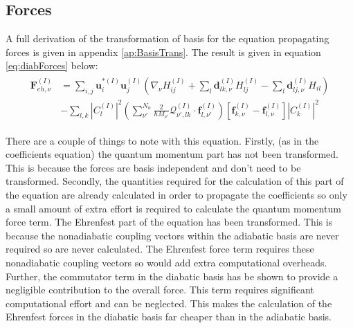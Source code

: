 \subsection{Forces}
A full derivation of the transformation of basis for the equation propagating forces is given in appendix \ref{ap:BasisTrans}. The result is given in equation \eqref{eq:diabForces} below:
\begin{align}
  \begin{split}
	  \mathbf{F}_{eh, \nu}^{(I)} &= \sum_{i,j} \mathbf{u}_{i}^{*(I)} \mathbf{u}_{j}^{(I)} \left( \nabla_{\nu} H_{ij}^{(I)} + \sum_{l} \mathbf{d}_{lk, \nu}^{(I)} H_{lj}^{(I)} - \sum_{l} \mathbf{d}_{lj, \nu}^{(I)} H_{il} \right) \\
	  &- \sum_{l,k} |C_{l}^{(I)}|^2 \left( \sum_{\nu'}^{N_{n}} \frac{2}{\hbar M_{\nu'}} \mathcal{Q}_{\nu', lk}^{(I)} \cdot                   \mathbf{f}_{l, \nu'}^{(I)} \right)\left[ \mathbf{f}_{k, \nu}^{(I)} -          \mathbf{f}_{l, \nu}^{(I)} \right] |C_{k}^{(I)}|^2
	\end{split}
  \label{eq:diabForces}
\end{align}

\noindent There are a couple of things to note with this equation. Firstly, (as in the coefficients equation) the quantum momentum part has not been transformed. This is because the forces are basis independent and don't need to be transformed. Secondly, the quantities required for the calculation of this part of the equation are already calculated in order to propagate the coefficients so only a small amount of extra effort is required to calculate the quantum momentum force term. The Ehrenfest part of the equation has been transformed. This is because the nonadiabatic coupling vectors within the adiabatic basis are never required so are never calculated. The Ehrenfest force term requires these nonadiabatic coupling vectors so would add extra computational overheads. Further, the commutator term in the diabatic basis has be shown to provide a negligible contribution to the overall force. This term requires significant computational effort and can be neglected. This makes the calculation of the Ehrenfest forces in the diabatic basis far cheaper than in the adiabatic basis.

